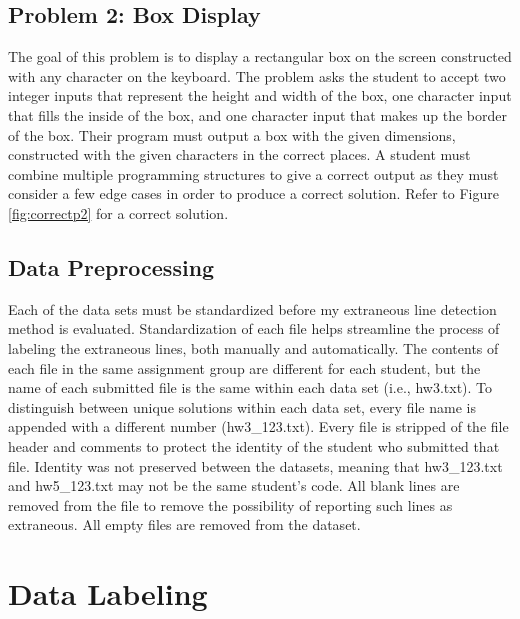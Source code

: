\documentclass[draft]{article}
\begin{document}


\subsection{Problem 2: Box Display}\label{p2desc}
The goal of this problem is to display a rectangular box on the screen constructed with any character on the keyboard. The problem asks the student to accept two integer inputs that represent the height and width of the box, one character input that fills the inside of the box, and one character input that makes up the border of the box. Their program must output a box with the given dimensions, constructed with the given characters in the correct places. A student must combine multiple programming structures to give a correct output as they must consider a few edge cases in order to produce a correct solution. Refer to Figure \ref{fig:correctp2} for a correct solution.

\subsection{Data Preprocessing}
Each of the data sets must be standardized before my extraneous line detection method is evaluated. Standardization of each file helps streamline the process of labeling the extraneous lines, both manually and automatically. The contents of each file in the same assignment group are different for each student, but the name of each submitted file is the same within each data set (i.e., hw3.txt). To distinguish between unique solutions within each data set, every file name is appended with a different number (hw3\_123.txt). Every file is stripped of the file header and comments to protect the identity of the student who submitted that file. Identity was not preserved between the datasets, meaning that hw3\_123.txt and hw5\_123.txt may not be the same student's code. All blank lines are removed from the file to remove the possibility of reporting such lines as extraneous. All empty files are removed from the dataset.

\section{Data Labeling}
\end{document}

